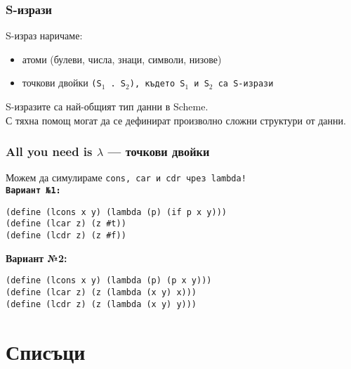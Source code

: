 \documentclass{beamer}
\begin{document}
\begin{frame}
  \frametitle{S-изрази}

  \begin{definition}
    S-израз наричаме:
    \begin{itemize}
    \item атоми (булеви, числа, знаци, символи, низове)
    \item точкови двойки \tt{(S$_1$ . S$_2$)}, където \tt{S$_1$} и \tt{S$_2$} са S-изрази
    \end{itemize}
  \end{definition}
  \vspace{1em}
  \pause
  \alert{S-изразите са най-общият тип данни в Scheme.}\\[1em]
  С тяхна помощ могат да се дефинират произволно сложни структури от данни.
\end{frame}

\begin{frame}[fragile]
  \frametitle{All you need is $\lambda$ --- точкови двойки}

  Можем да симулираме \tt{cons}, \tt{car} и \tt{cdr} чрез \tt{lambda}!\\[1em]
  \pause
  \textbf{Вариант №1:}
\begin{lstlisting}
(define (lcons x y) (lambda (p) (if p x y)))
(define (lcar z) (z #t))
(define (lcdr z) (z #f))
\end{lstlisting}
  \pause
  \textbf{Вариант №2:}
\begin{lstlisting}
(define (lcons x y) (lambda (p) (p x y)))
(define (lcar z) (z (lambda (x y) x)))
(define (lcdr z) (z (lambda (x y) y)))
\end{lstlisting}
\end{frame}

\section{Списъци}
\end{document}
